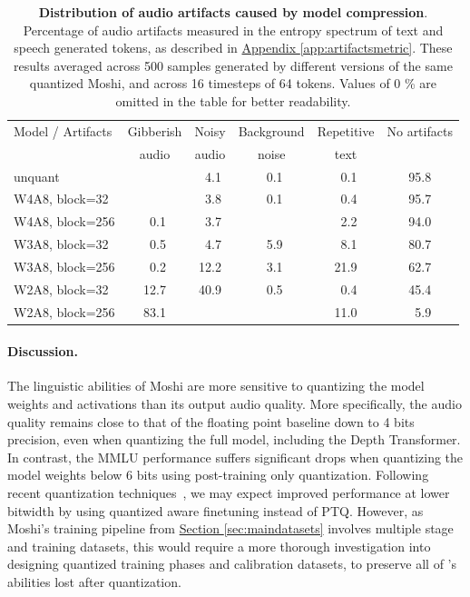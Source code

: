 \begin{table}[t]
    \caption{\textbf{Distribution of audio artifacts caused by model compression}. Percentage of audio artifacts measured in the entropy spectrum of text and speech generated tokens, as described in \hyperref[app:artifactsmetric]{Appendix \ref{app:artifactsmetric}}. These results averaged across 500 samples generated by different versions of the same quantized Moshi, and across 16 timesteps of 64 tokens. Values of 0 \% are omitted in the table for better readability.}
    \label{tab:artifactssummary}
    \footnotesize
    \centering
    \begin{tabular}{lccccc}
        \toprule
        Model / Artifacts & Gibberish  & Noisy  & Background & Repetitive & No artifacts \\
         & audio & audio & noise &  text & \\
         \midrule
         unquant & & \ 4.1 & \ 0.1  &  \ 0.1 & 95.8 \\
         \midrule
         W4A8, block=32 & & \ 3.8  & \ 0.1  & \ 0.4 & 95.7 \\
         W4A8, block=256 & \ 0.1 & \ 3.7 &  & \ 2.2 & 94.0 \\
         \midrule
         W3A8, block=32 & \ 0.5 & \ 4.7 & \ 5.9 & \ 8.1 & 80.7 \\
         W3A8, block=256 & \ 0.2 & 12.2 & \ 3.1  & 21.9 & 62.7 \\
         \midrule
         W2A8, block=32 & 12.7 & 40.9 & \ 0.5 &  \ 0.4 & 45.4 \\
         W2A8, block=256 & 83.1 & & &  11.0 &  \ 5.9 \\
        \bottomrule
    \end{tabular}
\end{table}

\paragraph{Discussion.} The linguistic abilities of Moshi are more sensitive to quantizing the model weights and activations than its output audio quality.
More specifically, the audio quality remains close to that of the floating point baseline down to 4 bits precision, even when quantizing the full model, including the Depth Transformer. 
In contrast, the MMLU performance suffers significant drops when quantizing the model weights below 6 bits using post-training only quantization.
Following recent quantization techniques~\citep{quipsharp}, we may expect improved performance at lower bitwidth by using quantized aware finetuning  instead of PTQ. However, as Moshi's training pipeline from \hyperref[sec:maindatasets]{Section \ref{sec:maindatasets}} involves multiple stage and training datasets, this would require a more thorough investigation into designing quantized training phases and calibration datasets, to preserve all of \ours{}'s abilities lost after quantization.


